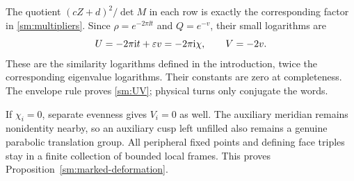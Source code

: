 The quotient $(cZ+d)^2/\det M$ in each row is exactly the
corresponding factor in \eqref{sm:multipliers}.
Since $\rho=e^{-2\pi\ii t}$ and $Q=e^{-v}$, their small logarithms are
\begin{equation}\label{sm:logs}
 U=-2\pi\mathrm i t+\varepsilon v=-2\pi\mathrm i\chi,\qquad V=-2v.
\end{equation}
These are the similarity logarithms defined in the introduction,
twice the corresponding eigenvalue logarithms. Their
constants are zero at completeness. The envelope rule proves
\eqref{sm:UV}; physical turns only conjugate the words.

If $\chi_i=0$, separate evenness gives $V_i=0$ as well. The
auxiliary meridian remains nonidentity nearby, so an auxiliary
cusp left unfilled also remains a genuine parabolic translation
group. All peripheral fixed points and defining face triples stay in a finite
collection of bounded local frames.
This proves Proposition~\ref{sm:marked-deformation}.
